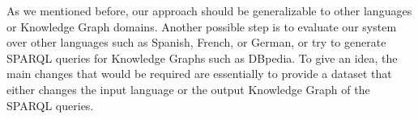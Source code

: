 As we mentioned before, our approach should be generalizable to other languages or Knowledge Graph 
domains. Another possible step is to evaluate our system over other languages such as Spanish, 
French, or German, or try to generate SPARQL queries for Knowledge Graphs such as DBpedia. To give 
an idea, the main changes that would be required are essentially to provide a dataset that either 
changes the input language or the output Knowledge Graph of the SPARQL queries. 
